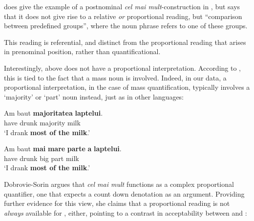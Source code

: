 \documentclass[output=paper
,modfonts
,nonflat]{langsci/langscibook}
\begin{document}
\citet{Dobrovie-Sorin2015} does give the example of a postnominal \textit{cel mai mult}-construction in , but says that  it does not give rise to a relative \textit{or} proportional reading, but ``comparison between predefined groups'', where the noun phrase refers to one of these groups.

\ea \label{ex:coppockstrand:47}
\begin{xlist}
\end{xlist}
\z

This reading is referential, and distinct from the proportional reading that arises in prenominal position, rather than quantificational. 

Interestingly,  above does not have a proportional interpretation. According to \citet{Dobrovie-Sorin2015}, this is tied to the fact that a mass noun is involved. 
Indeed, in our data, a proportional interpretation, in the case of mass quantification, typically involves a `majority' or `part' noun instead, just as in other  languages:

\ea \label{ex:coppockstrand:48}
\gll Am baut \textbf{majoritatea} \textbf{laptelui}.\\
have drunk majority milk\\
\glt `I drank \textbf{most of the milk}.'
\z

\ea \label{ex:coppockstrand:49}
\gll Am baut \textbf{mai} \textbf{mare} \textbf{parte} \textbf{a} \textbf{laptelui}.\\
have drunk \cmpr{} big part \gen{} milk\\
\glt `I drank \textbf{most of the milk}.'
\z

Dobrovie-Sorin argues that \textit{cel mai mult} functions as a complex proportional quantifier, one that expects a count down denotation as an argument. Providing further evidence for this view, she claims that a proportional reading is not \textit{always} available for , either, pointing to a contrast in acceptability between  and :
\end{document}
